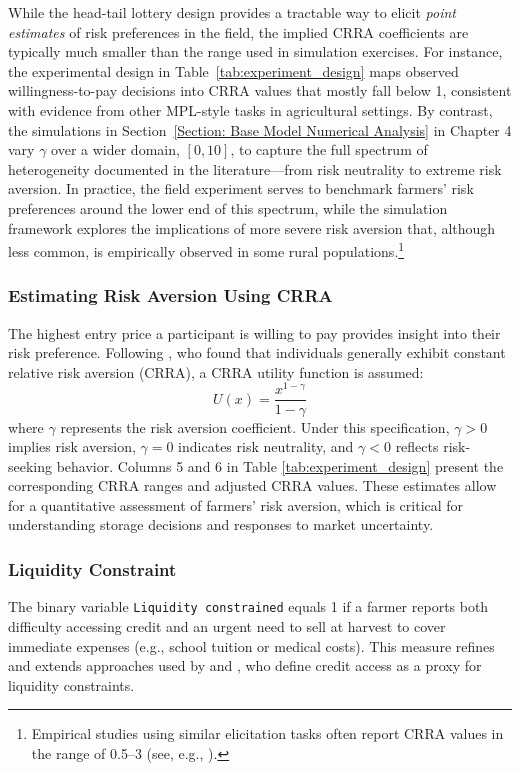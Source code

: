 While the head-tail lottery design provides a tractable way to elicit \textit{point estimates} of risk preferences in the field, the implied CRRA coefficients are typically much smaller than the range used in simulation exercises. For instance, the experimental design in Table~\ref{tab:experiment_design} maps observed willingness-to-pay decisions into CRRA values that mostly fall below 1, consistent with evidence from other MPL-style tasks in agricultural settings. By contrast, the simulations in Section~\ref{Section: Base Model Numerical Analysis} in Chapter 4 vary $\gamma$ over a wider domain, $[0,10]$, to capture the full spectrum of heterogeneity documented in the literature---from risk neutrality to extreme risk aversion. In practice, the field experiment serves to benchmark farmers' risk preferences around the lower end of this spectrum, while the simulation framework explores the implications of more severe risk aversion that, although less common, is empirically observed in some rural populations.\footnote{Empirical studies using similar elicitation tasks often report CRRA values in the range of 0.5--3 (see, e.g., \cite{liu2013time}).}



\subsubsection{Estimating Risk Aversion Using CRRA}  
\noindent The highest entry price a participant is willing to pay provides insight into their risk preference. Following \cite{chiappori2011relative}, who found that individuals generally exhibit constant relative risk aversion (CRRA), a CRRA utility function is assumed:  
\[
U(x) = \frac{x^{1-\gamma}}{1 - \gamma}
\]  
where \( \gamma \) represents the risk aversion coefficient. Under this specification, \( \gamma > 0 \) implies risk aversion, \( \gamma = 0 \) indicates risk neutrality, and \( \gamma < 0 \) reflects risk-seeking behavior. Columns 5 and 6 in Table \ref{tab:experiment_design} present the corresponding CRRA ranges and adjusted CRRA values. These estimates allow for a quantitative assessment of farmers' risk aversion, which is critical for understanding storage decisions and responses to market uncertainty.  

\subsubsection{Liquidity Constraint}  
\noindent The binary variable \texttt{Liquidity constrained} equals 1 if a farmer reports both difficulty accessing credit and an urgent need to sell at harvest to cover immediate expenses (e.g., school tuition or medical costs). This measure refines and extends approaches used by \cite{albuquerque2024market} and \cite{stephens2011incomplete}, who define credit access as a proxy for liquidity constraints.  

